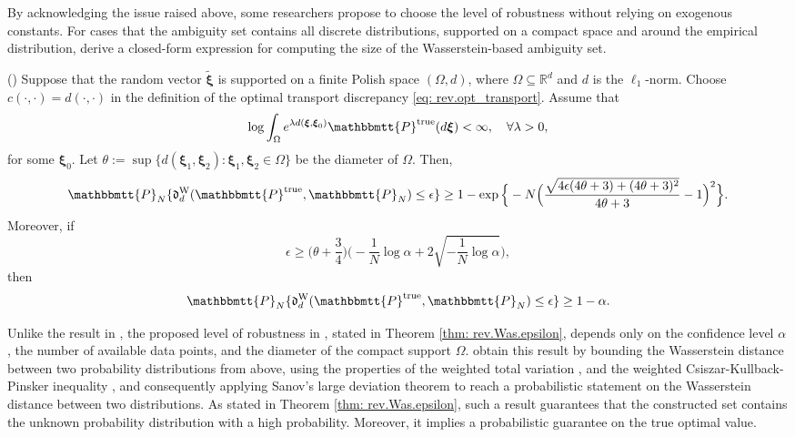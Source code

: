 \documentclass[final,onefignum,onetabnum]{class}
\newcommand{\bs}[1]{\boldsymbol{#1}} %
\newcommand{\Bs}[1]{\mathbb{#1}} %
\newcommand{\Ts}[1]{\mathbbmtt{#1}} %
\newcommand{\Fs}[1]{\mathfrak{#1}} %
\newcommand{\txi}{\tilde{\bs{\xi}}}
\newcommand{\trueP}{\Ts{P}^{\text{true}}}
\begin{document}
By acknowledging the issue  raised above, some researchers propose to choose the level of robustness without relying on exogenous constants. 
For cases that the ambiguity set contains all discrete  distributions, supported on a compact space and around the empirical distribution,  \citet{ji2017} derive a closed-form expression for computing the size of the Wasserstein-based ambiguity set. 
\begin{theorem}{(\citet[Theorem~2]{ji2017})}
    \label{thm: rev.Was.epsilon}
    Suppose that the random vector $\txi$ is supported on a finite Polish space $(\Omega, d)$, where $\Omega \subseteq \Bs{R}^{d}$ and $d$ is the $\ell_{1}$-norm. Choose $c(\cdot, \cdot)=d(\cdot, \cdot)$ in the definition of the optimal transport discrepancy \eqref{eq: rev.opt_transport}. Assume that  
    $$\log \int_{\Omega} e^{\lambda d(\bs{\xi},\bs{\xi}_{0})} \trueP(d \bs{\xi}) < \infty, \quad \forall \lambda >0,$$
    for some $\bs{\xi}_{0}$. 
    Let $\theta:=\sup\{d(\bs{\xi}_{1}, \bs{\xi}_{2}): \bs{\xi}_{1}, \bs{\xi}_{2} \in \Omega\}$ be the diameter of $\Omega$. 
    Then, $$\Ts{P}_{N}\{\Fs{d}^{\text{W}}_{d} (\trueP, \Ts{P}_{N}) \le \epsilon \} \ge 1- \exp\Big\{- N \Big( \frac{\sqrt{4 \epsilon (4 \theta +3) + (4 \theta +3 )^{2} }}{4 \theta + 3 }-1\Big)^{2}\Big\}.$$
    Moreover, if 
    $$\epsilon \ge \Big( \theta + \frac{3}{4}\Big) \Big(-\frac{1}{N} \log \alpha + 2 \sqrt{-\frac{1}{N} \log \alpha}\Big),$$
    then 
    $$\Ts{P}_{N}\{\Fs{d}^{\text{W}}_{d} (\trueP, \Ts{P}_{N}) \le \epsilon \} \ge 1-\alpha.$$
\end{theorem}
Unlike the result in \citet{pflug2007}, the proposed level of robustness in  \citet{ji2017}, stated in Theorem \ref{thm: rev.Was.epsilon}, depends  only  on the confidence level $\alpha$, the number of available data points, and the diameter of the compact support $\Omega$.  \citet{ji2017} obtain this result by bounding  the Wasserstein distance between two probability distributions from  above, using the properties of the weighted total variation \citep{bolley2005}, and the weighted Csiszar-Kullback-Pinsker inequality \citep{villani2008}, and consequently applying Sanov's large deviation theorem \citep{dembo1998} to reach a probabilistic statement on the Wasserstein distance between  two distributions.
As stated in Theorem \ref{thm: rev.Was.epsilon}, such a result guarantees that the constructed set  contains the unknown probability distribution  with a high probability. Moreover, it implies a probabilistic guarantee on the true optimal value. 
\end{document}
